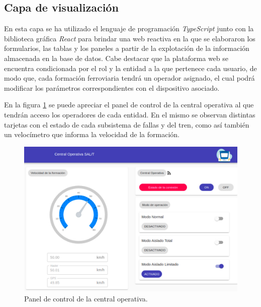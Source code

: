 \subsection{Capa de visualización}

  En esta capa se ha utilizado el lenguaje de programación \textit{TypeScript} \cite{b19} junto con la biblioteca gráfica \textit{React} \cite{b20} para brindar una web reactiva en la que se elaboraron los formularios, las tablas y los paneles a partir de la explotación de la información almacenada en la base de datos. Cabe destacar que la plataforma web se encuentra condicionada por el rol y la entidad a la que pertenece cada usuario, de modo que, cada formación ferroviaria tendrá un operador asignado, el cual podrá modificar los parámetros correspondientes con el dispositivo asociado.

En la figura \ref{fig:dashboard} se puede apreciar el panel de control de la central operativa al que tendrán acceso los operadores de cada entidad.
En el mismo se observan distintas tarjetas con el estado de cada subsistema de fallas y del tren, como así también un velocímetro que
informa la velocidad de la formación.

\begin{figure}[ht]
\centering 
\includegraphics[width=.48\textwidth]{images/v2.1.0/dashboard.jpg}
\caption{Panel de control de la central operativa.}
\label{fig:dashboard}
\end{figure}
